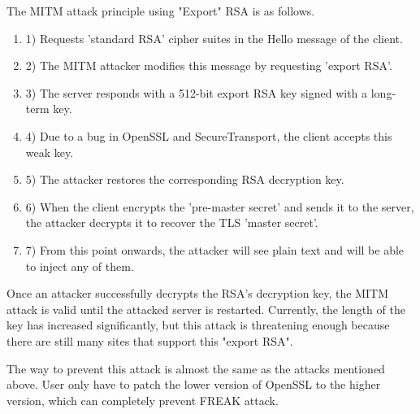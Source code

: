 \documentclass[a4paper]{article}
\begin{document}
The MITM attack principle using "Export" RSA is as follows. 
\begin{enumerate}[label=]
      \item 1) Requests 'standard RSA' cipher suites in the Hello message of the client.
      \item 2) The MITM attacker modifies this message by requesting 'export RSA'.
      \item 3) The server responds with a 512-bit export RSA key signed with a long-term key.
      \item 4) Due to a bug in OpenSSL and SecureTransport, the client accepts this weak key.
      \item 5) The attacker restores the corresponding RSA decryption key.
      \item 6) When the client encrypts the 'pre-master secret' and sends it to the server, the attacker decrypts it to recover the TLS 'master secret'.
      \item 7) From this point onwards, the attacker will see plain text and will be able to inject any of them.    
\end{enumerate}  

      
Once an attacker successfully decrypts the RSA's decryption key, the MITM attack is valid until the attacked server is restarted. Currently, the length of the key has increased significantly, but this attack is threatening enough because there are still many sites that support this "export RSA". 

The way to prevent this attack is almost the same as the attacks mentioned above. User only have to patch the lower version of OpenSSL to the higher version, which can completely prevent FREAK attack.
\end{document}
